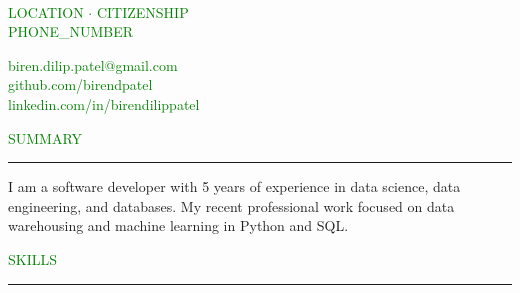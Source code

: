 \documentclass [
        11pt
] {article}
\begin{document}
\begin{multicols}{2}

\\
\noindent \textcolor{green}{LOCATION $ \boldsymbol{\cdot} $ CITIZENSHIP}\\
	\noindent \textcolor{green}{PHONE_NUMBER}\\

\columnbreak

\hspace*{\fill} \noindent \textcolor{green}{biren.dilip.patel@gmail.com}\\
\hspace*{\fill} \noindent \textcolor{green}{github.com/birendpatel}\\
\hspace*{\fill} \noindent \textcolor{green}{linkedin.com/in/birendilippatel}

\end{multicols}


\noindent\textcolor{green}{SUMMARY \rule{16.35cm}{1pt}}

\vspace*{10pt}

\noindent I am a software developer with 5 years of experience in data science, 
data engineering, and databases. My recent professional work focused on data
warehousing and machine learning in Python and SQL.

\vspace*{10pt}



\noindent\textcolor{green}{SKILLS \rule{17cm}{1pt}}
\end{document}
